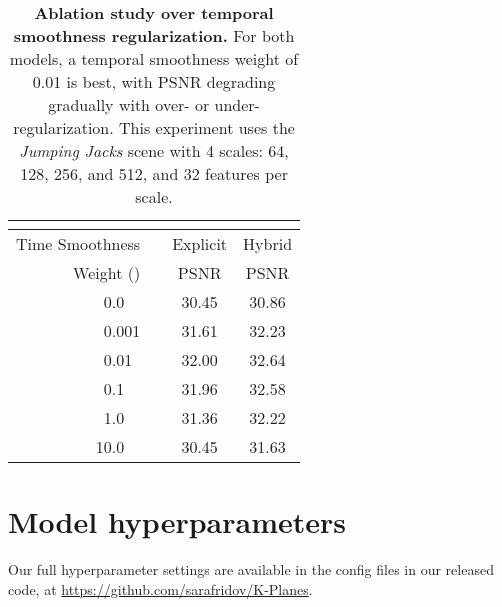 \documentclass[10pt,twocolumn,letterpaper]{article}
\begin{document}
\renewcommand{\tabcolsep}{6pt}
\begin{table}[ht]
  \centering
  \begin{tabular}{rlcc}
    \multicolumn{4}{c}{} \\
    \toprule
     Time Smoothness & & Explicit   & Hybrid    \\ 
     Weight () && PSNR  & PSNR  \\
    \cmidrule(){1-1} \cmidrule(){3-4} 
0.0\textcolor{white}{00} && 30.45 &
30.86 \\
    0.001 && 31.61 &
32.23 \\
    0.01\textcolor{white}{0} && 32.00 &
32.64 \\ 
    0.1\textcolor{white}{00} && 31.96 &
32.58 \\
    1.0\textcolor{white}{00} && 31.36 &
32.22 \\
    10.0\textcolor{white}{00} && 30.45 &
31.63 \\
\bottomrule
  \end{tabular}
  \caption{\textbf{Ablation study over temporal smoothness regularization.} For both models, a temporal smoothness weight of 0.01 is best, with PSNR degrading gradually with over- or under-regularization. This experiment uses the \emph{Jumping Jacks} scene with 4 scales: 64, 128, 256, and 512, and 32 features per scale.}
  \label{tab:smoothness}
\end{table}


\section{Model hyperparameters}

Our full hyperparameter settings are available in the config files in our released code, at \url{https://github.com/sarafridov/K-Planes}.
\end{document}
